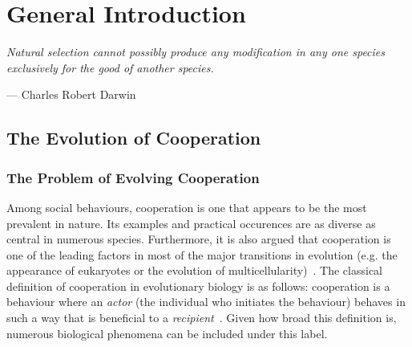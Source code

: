 \chapter{General Introduction}

\epigraph{\textit{Natural selection cannot possibly produce any modification in any one species exclusively for the good of another species.}}{--- \textup{Charles Robert Darwin}}

\minitoc[n] %


\section{The Evolution of Cooperation}

  \subsection{The Problem of Evolving Cooperation}

    Among social behaviours, cooperation is one that appears to be the most prevalent in nature. Its examples and practical occurences are as diverse as central in numerous species. Furthermore, it is also argued that cooperation is one of the leading factors in most of the major transitions in evolution (e.g. the appearance of eukaryotes or the evolution of multicellularity)~\parencite{Szathmary1995}. The classical definition of cooperation in evolutionary biology is as follows: cooperation is a behaviour where an \emph{actor} (the individual who initiates the behaviour) behaves in such a way that is beneficial to a \emph{recipient}~\parencite{West2007a}. Given how broad this definition is, numerous biological phenomena can be included under this label. 

